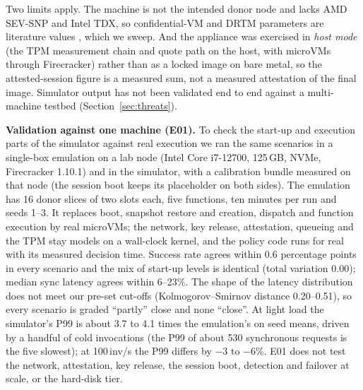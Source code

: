 \begin{table}[t]
\caption{Calibration entries (s unless noted): placeholder versus measured on the calibration laptop. Ratio is measured over placeholder.}
\label{tab:calib}
\centering\scriptsize
\resizebox{\columnwidth}{!}{}
\end{table}

Two limits apply. The machine is not the intended donor node and lacks AMD SEV-SNP and Intel TDX, so confidential-VM and DRTM parameters are literature values \cite{misono2025cvm,holmes2024severifast,li2023bifrost}, which we sweep. And the appliance was exercised in
\emph{host mode} (the TPM measurement chain and quote path on the host, with microVMs through Firecracker) rather than as a locked image on bare metal, so the attested-session figure is a measured sum, not a measured attestation of the final image. Simulator output has
not been validated end to end against a multi-machine testbed (Section~\ref{sec:threats}).

\textbf{Validation against one machine (E01).} To check the start-up and execution parts of the simulator against real execution we ran the same scenarios in a single-box emulation on a lab node (Intel Core i7-12700, 125\,GB, NVMe, Firecracker 1.10.1) and in the simulator, with a calibration bundle measured on that node (the session boot keeps its placeholder on both sides). The emulation has 16 donor slices of two slots each, five functions, ten minutes per run and seeds 1--3. It replaces boot, snapshot restore and creation, dispatch and function execution by real microVMs; the network, key release, attestation, queueing and the TPM stay models on a wall-clock kernel, and the policy code runs for real with its measured decision time. Success rate agrees within 0.6 percentage points in every scenario and the mix of start-up levels is identical (total variation 0.00); median sync latency agrees within 6--23\%. The shape of the latency distribution does not meet our pre-set cut-offs (Kolmogorov--Smirnov distance 0.20--0.51), so every scenario is graded ``partly'' close and none ``close''. At light load the simulator's P99 is about 3.7 to 4.1 times the emulation's on seed means, driven by a handful of cold invocations (the P99 of about 530 synchronous requests is the five slowest); at 100\,inv/s the P99 differs by $-3$ to $-6$\%. E01 does not test the network, attestation, key release, the session boot, detection and failover at scale, or the hard-disk tier.

